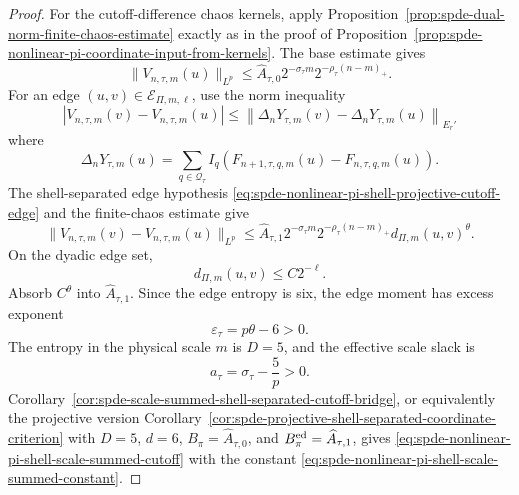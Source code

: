 \begin{proof}
For the cutoff-difference chaos kernels, apply
Proposition~\ref{prop:spde-dual-norm-finite-chaos-estimate} exactly as in
the proof of
Proposition~\ref{prop:spde-nonlinear-pi-coordinate-input-from-kernels}.
The base estimate gives
\[
  \|V_{n,\tau,m}(u)\|_{L^p}
  \leq
  \widehat A_{\tau,0}
  2^{-\sigma_\tau m}2^{-\rho_\tau(n-m)_+}.
\]
For an edge \((u,v)\in\mathcal E_{\Pi,m,\ell}\), use the norm inequality
\[
  |V_{n,\tau,m}(v)-V_{n,\tau,m}(u)|
  \leq
  \left\|
    \Delta_nY_{\tau,m}(v)-\Delta_nY_{\tau,m}(u)
  \right\|_{E_r'}
\]
where
\[
  \Delta_nY_{\tau,m}(u)
  =
  \sum_{q\in\mathcal Q_\tau}
  I_q(F_{n+1,\tau,q,m}(u)-F_{n,\tau,q,m}(u)).
\]
The shell-separated edge hypothesis
\eqref{eq:spde-nonlinear-pi-shell-projective-cutoff-edge} and
the finite-chaos estimate give
\[
  \|V_{n,\tau,m}(v)-V_{n,\tau,m}(u)\|_{L^p}
  \leq
  \widehat A_{\tau,1}
  2^{-\sigma_\tau m}2^{-\rho_\tau(n-m)_+}
  d_{\Pi,m}(u,v)^\theta .
\]
On the dyadic edge set,
\[
  d_{\Pi,m}(u,v)\leq C2^{-\ell}.
\]
Absorb \(C^\theta\) into \(\widehat A_{\tau,1}\).  Since the edge entropy is
six, the edge moment has excess exponent
\[
  \varepsilon_\tau=p\theta-6>0 .
\]
The entropy in the physical scale \(m\) is \(D=5\), and the effective
scale slack is
\[
  a_\tau=\sigma_\tau-\frac5p>0 .
\]
Corollary~\ref{cor:spde-scale-summed-shell-separated-cutoff-bridge}, or
equivalently the projective version
Corollary~\ref{cor:spde-projective-shell-separated-coordinate-criterion}
with \(D=5\), \(d=6\), \(B_\pi=\widehat A_{\tau,0}\), and
\(B_\pi^{\rm ed}=\widehat A_{\tau,1}\), gives
\eqref{eq:spde-nonlinear-pi-shell-scale-summed-cutoff} with the constant
\eqref{eq:spde-nonlinear-pi-shell-scale-summed-constant}.
\end{proof}

